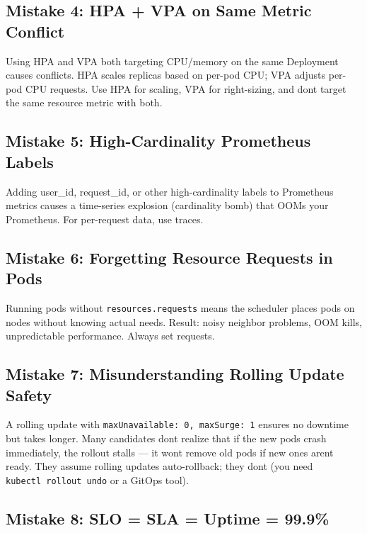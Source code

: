 \documentclass[11pt]{article}
\begin{document}
\subsection{Mistake 4: HPA + VPA on Same Metric Conflict}\label{mistake-4-hpa--vpa-on-same-metric-conflict}

Using HPA and VPA both targeting CPU/memory on the same Deployment causes conflicts. HPA scales replicas based on per-pod CPU; VPA adjusts per-pod CPU requests. Use HPA for scaling, VPA for right-sizing, and don\textquotesingle t target the same resource metric with both.

\subsection{Mistake 5: High-Cardinality Prometheus Labels}\label{mistake-5-high-cardinality-prometheus-labels}

Adding user\_id, request\_id, or other high-cardinality labels to Prometheus metrics causes a time-series explosion (cardinality bomb) that OOMs your Prometheus. For per-request data, use traces.

\subsection{Mistake 6: Forgetting Resource Requests in Pods}\label{mistake-6-forgetting-resource-requests-in-pods}

Running pods without \texttt{resources.requests} means the scheduler places pods on nodes without knowing actual needs. Result: noisy neighbor problems, OOM kills, unpredictable performance. Always set requests.

\subsection{Mistake 7: Misunderstanding Rolling Update Safety}\label{mistake-7-misunderstanding-rolling-update-safety}

A rolling update with \texttt{maxUnavailable:\ 0,\ maxSurge:\ 1} ensures no downtime but takes longer. Many candidates don\textquotesingle t realize that if the new pods crash immediately, the rollout stalls --- it won\textquotesingle t remove old pods if new ones aren\textquotesingle t ready. They assume rolling updates auto-rollback; they don\textquotesingle t (you need \texttt{kubectl\ rollout\ undo} or a GitOps tool).

\subsection{Mistake 8: SLO = SLA = Uptime = 99.9\%}\label{mistake-8-slo--sla--uptime--999}
\end{document}
